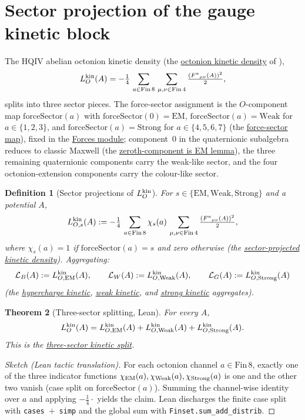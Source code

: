 \documentclass[11pt]{amsart}
\newtheorem{theorem}{Theorem}[section]
\newtheorem{definition}[theorem]{Definition}
\begin{document}
\section{Sector projection of the gauge kinetic block}
\label{sec:gauge}

The HQIV abelian octonion kinetic density (the
\hyperref[lean:LO-kin]{octonion kinetic density} of
\cite{hqiv-oct-action-paper}),
\[
L_O^{\rm kin}(A)
= -\tfrac14\,\sum_{a\in\mathrm{Fin}\,8}\,\sum_{\mu,\nu\in\mathrm{Fin}\,4}
\tfrac{(F^a{}_{\mu\nu}(A))^2}{2},
\]
splits into three sector pieces. The force-sector assignment is the
$O$-component map $\mathrm{forceSector}(a)$ with
$\mathrm{forceSector}(0)=\mathrm{EM}$,
$\mathrm{forceSector}(a)=\mathrm{Weak}$ for $a\in\{1,2,3\}$, and
$\mathrm{forceSector}(a)=\mathrm{Strong}$ for $a\in\{4,5,6,7\}$ (the
\hyperref[lean:O-to-sector]{force-sector map}), fixed in the
\hyperref[lean:forces]{Forces module}; component~$0$ in the quaternionic
subalgebra reduces to classic Maxwell (the
\hyperref[lean:O-zero-EM]{zeroth-component is EM lemma}), the three
remaining quaternionic components carry the weak-like sector, and the four
octonion-extension components carry the colour-like sector.

\begin{definition}[Sector projections of $L_O^{\rm kin}$]
\label{def:LSM-kin}
For $s\in\{\text{EM},\text{Weak},\text{Strong}\}$ and a potential $A$,
\[
L^{\rm kin}_{O,s}(A)
:= -\tfrac14\,\sum_{a\in\mathrm{Fin}\,8} \chi_s(a)\,
\sum_{\mu,\nu\in\mathrm{Fin}\,4}\tfrac{(F^a{}_{\mu\nu}(A))^2}{2},
\]
where $\chi_s(a)=1$ if $\mathrm{forceSector}(a)=s$ and zero otherwise (the
\hyperref[lean:LO-kin-sector]{sector-projected kinetic density}). Aggregating:
\[
\mathcal{L}_B(A) := L^{\rm kin}_{O,{\rm EM}}(A),\qquad
\mathcal{L}_W(A) := L^{\rm kin}_{O,{\rm Weak}}(A),\qquad
\mathcal{L}_G(A) := L^{\rm kin}_{O,{\rm Strong}}(A)
\]
(the \hyperref[lean:LSM-B-kin]{hypercharge kinetic},
\hyperref[lean:LSM-W-kin]{weak kinetic}, and
\hyperref[lean:LSM-G-kin]{strong kinetic} aggregates).
\end{definition}

\begin{theorem}[Three-sector splitting, Lean]
\label{thm:sector-split}
For every $A$,
\[
L_O^{\rm kin}(A)
= L^{\rm kin}_{O,{\rm EM}}(A) + L^{\rm kin}_{O,{\rm Weak}}(A) + L^{\rm kin}_{O,{\rm Strong}}(A) .
\]
This is the \hyperref[lean:LO-kinetic-split]{three-sector kinetic split}.
\end{theorem}

\begin{proof}[Sketch (Lean tactic translation)]
For each octonion channel $a\in\mathrm{Fin}\,8$, exactly one of the three
indicator functions $\chi_{\rm EM}(a), \chi_{\rm Weak}(a), \chi_{\rm Strong}(a)$
is one and the other two vanish (case split on $\mathrm{forceSector}(a)$).
Summing the channel-wise identity over $a$ and applying $-\tfrac14\cdot$
yields the claim. Lean discharges the finite case split with
\texttt{cases}~$+$~\texttt{simp} and the global sum with
\texttt{Finset.sum\_add\_distrib}.
\end{proof}
\end{document}
